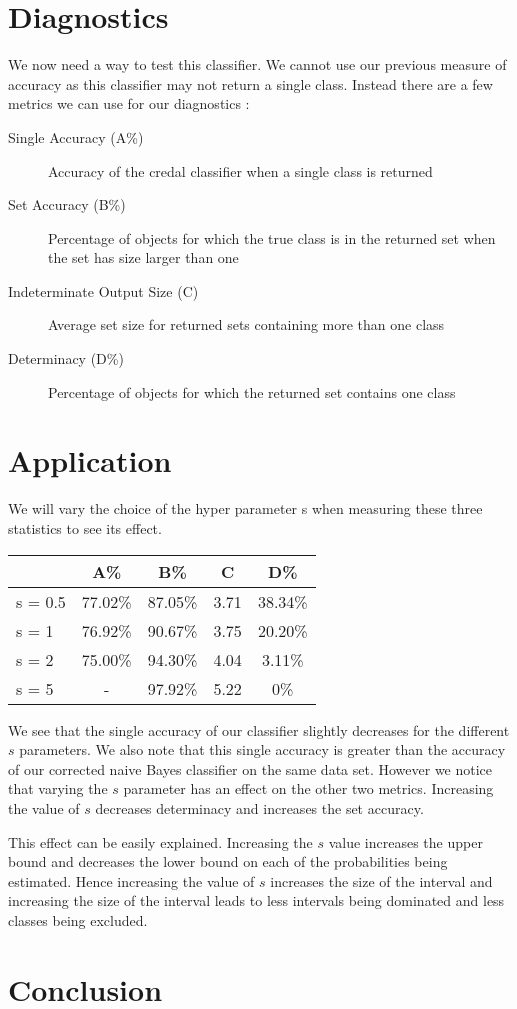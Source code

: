 \section{Diagnostics}

We now need a way to test this classifier.
We cannot use our previous measure of accuracy as this classifier may not return a single class.
Instead there are a few metrics we can use for our diagnostics \cite{Antonucci11}:
\begin{description}
	\item[Single Accuracy (A\%)] Accuracy of the credal classifier when a single class is returned
	\item[Set Accuracy (B\%)] Percentage of objects for which the true class is in the returned set when the set has size larger than one
	\item[Indeterminate Output Size (C)] Average set size for returned sets containing more than one class
	\item[Determinacy (D\%)] Percentage of objects for which the returned set contains one class
\end{description}

\section{Application}

We will vary the choice of the hyper parameter s when measuring these three statistics to see its effect.


\begin{center}
\begin{tabular}{l|c c c c}
        & A\%     & B\%     & C    & D\%     \\
\hline
s = 0.5 & 77.02\% & 87.05\% & 3.71 & 38.34\% \\
s = 1   & 76.92\% & 90.67\% & 3.75 & 20.20\% \\
s = 2   & 75.00\% & 94.30\% & 4.04 & 3.11\% \\
s = 5   & -       & 97.92\% & 5.22 & 0\%   \\
\end{tabular}
\end{center}

We see that the single accuracy of our classifier slightly decreases for the different $s$ parameters.
We also note that this single accuracy is greater than the accuracy of our corrected naive Bayes classifier on the same data set.
However we notice that varying the $s$ parameter has an effect on the other two metrics.
Increasing the value of $s$ decreases determinacy and increases the set accuracy.

This effect can be easily explained.
Increasing the $s$ value increases the upper bound and decreases the lower bound on each of the probabilities being estimated.
Hence increasing the value of $s$ increases the size of the interval and increasing the size of the interval leads to less intervals being dominated and less classes being excluded.

\section{Conclusion}